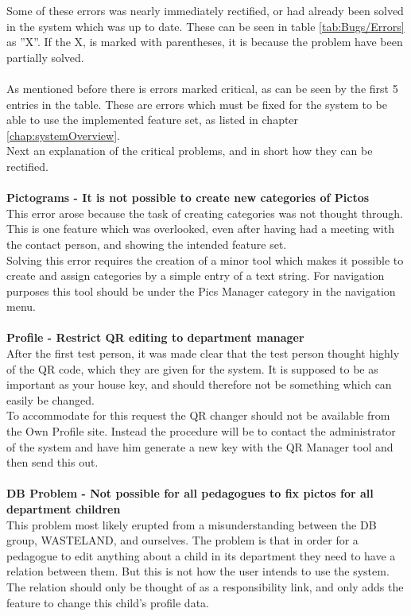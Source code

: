Some of these errors was nearly immediately rectified, or had already been solved in the system which was up to date. These can be seen in table \ref{tab:Bugs/Errors} as ''X''. If the X, is marked with parentheses, it is because the problem have been partially solved.\\
\\
As mentioned before there is errors marked critical, as can be seen by the first 5 entries in the table. These are errors which must be fixed for the system to be able to use the implemented feature set, as listed in chapter \vref{chap:systemOverview}.\\
Next an explanation of the critical problems, and in short how they can be rectified.\\
\\
\textbf{Pictograms - It is not possible to create new categories of Pictos}\\
This error arose because the task of creating categories was not thought through. This is one feature which was overlooked, even after having had a meeting with the contact person, and showing the intended feature set.\\
Solving this error requires the creation of a minor tool which makes it possible to create and assign categories by a simple entry of a text string. For navigation purposes this tool should be under the Pics Manager category in the navigation menu.\\
\\
\textbf{Profile - Restrict QR editing to department manager}\\
After the first test person, it was made clear that the test person thought highly of the QR code, which they are given for the system. It is supposed to be as important as your house key, and should therefore not be something which can easily be changed.\\
To accommodate for this request the QR changer should not be available from the Own Profile site. Instead the procedure will be to contact the administrator of the system and have him generate a new key with the QR Manager tool and then send this out.\\
\\
\textbf{DB Problem - Not possible for all pedagogues to fix pictos for all department children}\\
This problem most likely erupted from a misunderstanding between the DB group, WASTELAND, and ourselves. The problem is that in order for a pedagogue to edit anything about a child in its department they need to have a relation between them. But this is not how the user intends to use the system. The relation should only be thought of as a responsibility link, and only adds the feature to change this child's profile data.\\
